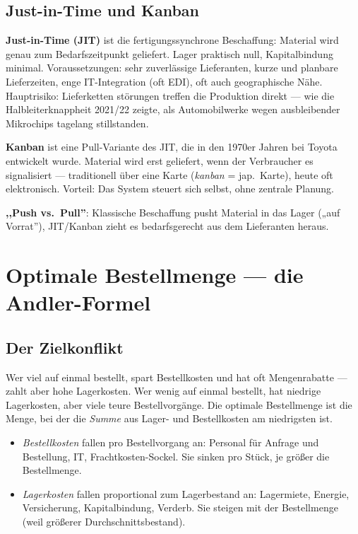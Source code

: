 \documentclass[11pt, a4paper]{article}
\begin{document}
\subsection{Just-in-Time und Kanban}

\textbf{Just-in-Time (JIT)} ist die fertigungssynchrone Beschaffung: Material wird
genau zum Bedarfszeit\-punkt geliefert. Lager praktisch null, Kapital­bindung minimal.
Voraussetzungen: sehr zuverlässige Lieferanten, kurze und planbare Lieferzeiten,
enge IT-Integration (oft EDI), oft auch geographische Nähe. Hauptrisiko: Lieferketten\-
störungen treffen die Produktion direkt --- wie die Halbleiterknappheit 2021/22 zeigte,
als Automobil­werke wegen ausbleibender Mikrochips tagelang stillstanden.

\textbf{Kanban} ist eine Pull-Variante des JIT, die in den 1970er Jahren bei Toyota
entwickelt wurde. Material wird erst geliefert, wenn der Verbraucher es signalisiert
--- traditionell über eine Karte (\emph{kanban} = jap.\ Karte), heute oft elektronisch.
Vorteil: Das System steuert sich selbst, ohne zentrale Planung.

\begin{eselsbruecke}
\textbf{,,Push vs.\ Pull''}: Klassische Beschaffung pusht Material in das Lager
(„auf Vorrat''), JIT/Kanban zieht es bedarfsgerecht aus dem Lieferanten heraus.
\end{eselsbruecke}

\section{Optimale Bestellmenge --- die Andler-Formel}

\subsection{Der Zielkonflikt}

Wer viel auf einmal bestellt, spart Bestellkosten und hat oft Mengenrabatte ---
zahlt aber hohe Lagerkosten. Wer wenig auf einmal bestellt, hat niedrige Lagerkosten,
aber viele teure Bestellvorgänge. Die optimale Bestellmenge ist die Menge, bei der die
\emph{Summe} aus Lager- und Bestell­kosten am niedrigsten ist.

\begin{itemize}[itemsep=0pt]
  \item \emph{Bestellkosten} fallen pro Bestellvorgang an: Personal für Anfrage und Bestellung, IT, Frachtkosten-Sockel. Sie sinken pro Stück, je größer die Bestellmenge.
  \item \emph{Lagerkosten} fallen proportional zum Lagerbestand an: Lagermiete, Energie, Versicherung, Kapital­bindung, Verderb. Sie steigen mit der Bestellmenge (weil größerer Durchschnittsbestand).
\end{itemize}
\end{document}
